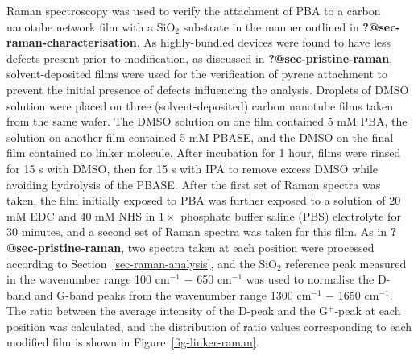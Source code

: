 \documentclass[
  a4paper,
]{scrbook}
\begin{document}
Raman spectroscopy was used to verify the attachment of PBA to a carbon
nanotube network film with a SiO\(_2\) substrate in the manner outlined
in \textbf{?@sec-raman-characterisation}. As highly-bundled devices were
found to have less defects present prior to modification, as discussed
in \textbf{?@sec-pristine-raman}, solvent-deposited films were used for
the verification of pyrene attachment to prevent the initial presence of
defects influencing the analysis. Droplets of DMSO solution were placed
on three (solvent-deposited) carbon nanotube films taken from the same
wafer. The DMSO solution on one film contained 5 mM PBA, the solution on
another film contained 5 mM PBASE, and the DMSO on the final film
contained no linker molecule. After incubation for 1 hour, films were
rinsed for 15 s with DMSO, then for 15 s with IPA to remove excess DMSO
while avoiding hydrolysis of the PBASE. After the first set of Raman
spectra was taken, the film initially exposed to PBA was further exposed
to a solution of 20 mM EDC and 40 mM NHS in \(1 \times\) phosphate
buffer saline (PBS) electrolyte for 30 minutes, and a second set of
Raman spectra was taken for this film. As in
\textbf{?@sec-pristine-raman}, two spectra taken at each position were
processed according to Section~\ref{sec-raman-analysis}, and the
SiO\(_2\) reference peak measured in the wavenumber range 100
cm\(^{-1}\) \(-\) 650 cm\(^{-1}\) was used to normalise the D-band and
G-band peaks from the wavenumber range 1300 cm\(^{-1}\) \(-\) 1650
cm\(^{-1}\). The ratio between the average intensity of the D-peak and
the G\(^+\)-peak at each position was calculated, and the distribution
of ratio values corresponding to each modified film is shown in
Figure~\ref{fig-linker-raman}.
\end{document}
